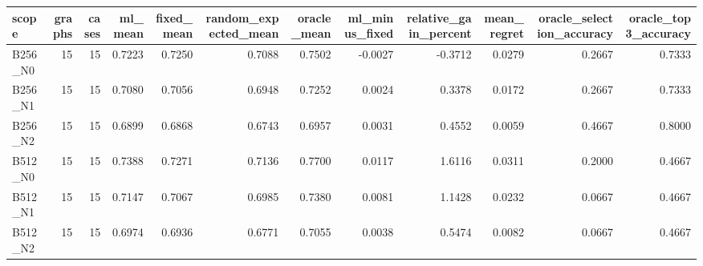\begin{tabular}{lrrrrrrrrrrr}
\toprule
scope & graphs & cases & ml_mean & fixed_mean & random_expected_mean & oracle_mean & ml_minus_fixed & relative_gain_percent & mean_regret & oracle_selection_accuracy & oracle_top3_accuracy \\
\midrule
B256_N0 & 15 & 15 & 0.7223 & 0.7250 & 0.7088 & 0.7502 & -0.0027 & -0.3712 & 0.0279 & 0.2667 & 0.7333 \\
B256_N1 & 15 & 15 & 0.7080 & 0.7056 & 0.6948 & 0.7252 & 0.0024 & 0.3378 & 0.0172 & 0.2667 & 0.7333 \\
B256_N2 & 15 & 15 & 0.6899 & 0.6868 & 0.6743 & 0.6957 & 0.0031 & 0.4552 & 0.0059 & 0.4667 & 0.8000 \\
B512_N0 & 15 & 15 & 0.7388 & 0.7271 & 0.7136 & 0.7700 & 0.0117 & 1.6116 & 0.0311 & 0.2000 & 0.4667 \\
B512_N1 & 15 & 15 & 0.7147 & 0.7067 & 0.6985 & 0.7380 & 0.0081 & 1.1428 & 0.0232 & 0.0667 & 0.4667 \\
B512_N2 & 15 & 15 & 0.6974 & 0.6936 & 0.6771 & 0.7055 & 0.0038 & 0.5474 & 0.0082 & 0.0667 & 0.4667 \\
\bottomrule
\end{tabular}
